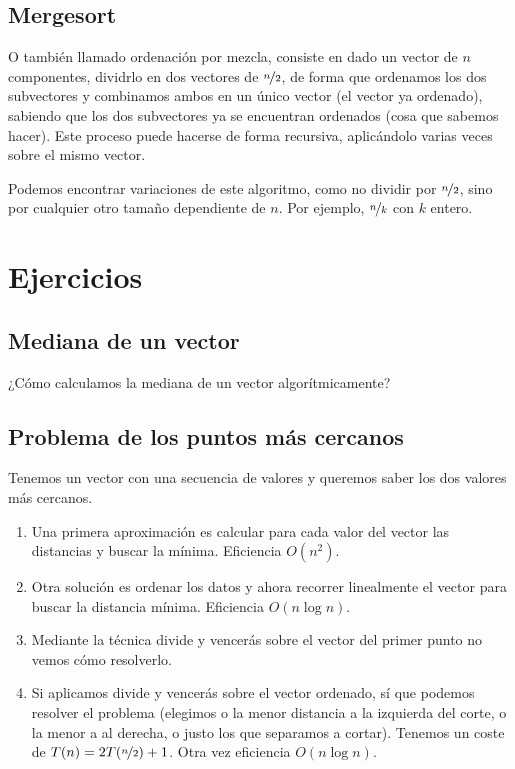 
\subsection{Mergesort}
O también llamado ordenación por mezcla, consiste en dado un vector de $n$ componentes, dividrlo en dos vectores de $\nicefrac{n}{2}$, de forma que ordenamos los dos subvectores y combinamos ambos en un único vector (el vector ya ordenado), sabiendo que los dos subvectores ya se encuentran ordenados (cosa que sabemos hacer). Este proceso puede hacerse de forma recursiva, aplicándolo varias veces sobre el mismo vector.

Podemos encontrar variaciones de este algoritmo, como no dividir por $\nicefrac{n}{2}$, sino por cualquier otro tamaño dependiente de $n$. Por ejemplo, $\nicefrac{n}{k}$ con $k$ entero.

\section{Ejercicios}
\subsection{Mediana de un vector}
\begin{ejercicio*}
    ¿Cómo calculamos la mediana de un vector algorítmicamente?

\end{ejercicio*}

\subsection{Problema de los puntos más cercanos}
\begin{ejercicio*}
    Tenemos un vector con una secuencia de valores y queremos saber los dos valores más cercanos.

    \begin{enumerate}
        \item Una primera aproximación es calcular para cada valor del vector las distancias y buscar la mínima. Eficiencia $O(n^2)$.
        \item Otra solución es ordenar los datos y ahora recorrer linealmente el vector para buscar la distancia mínima. Eficiencia $O(n\log n)$.
        \item Mediante la técnica divide y vencerás sobre el vector del primer punto no vemos cómo resolverlo.
        \item Si aplicamos divide y vencerás sobre el vector ordenado, sí que podemos resolver el problema (elegimos o la menor distancia a la izquierda del corte, o la menor a al derecha, o justo los que separamos a cortar). Tenemos un coste de $T(n) = 2T(\nicefrac{n}{2})+1$. Otra vez eficiencia $O(n\log n)$.
    \end{enumerate}
\end{ejercicio*}

